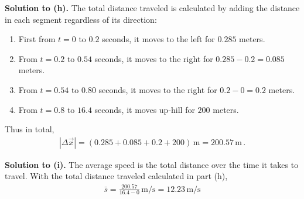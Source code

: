 \documentclass[11pt]{article}
\begin{document}
\textbf{Solution to (h). } The total distance traveled is calculated by adding the distance in each segment regardless of its direction: 
\begin{enumerate}
\item First from $t=0$ to $0.2$ seconds, it moves to the left for $0.285$ meters. 
\item From $t=0.2$ to $0.54$ seconds, it moves to the right for $0.285-0.2 = 0.085$ meters.
\item  From $t=0.54$ to $0.80$ seconds, it moves to the right for $0.2-0 = 0.2$ meters.
\item From $t=0.8$ to $16.4$ seconds, it moves up-hill for $200$ meters.
\end{enumerate}
Thus in total, 
\begin{align*}
|\Delta \vec{x}| =( 0.285+0.085+0.2+200)\,\text{m} = 200.57\,\text{m}\,.
\end{align*}

\textbf{Solution to (i).} The average speed is the total distance over the time it takes to travel. With the total distance traveled calculated in part (h), 
\begin{align*}
\bar{s} = \frac{200.57}{16.4-0} \,\text{m/s} = 12.23\,\text{m/s}
\end{align*}
\end{document}
